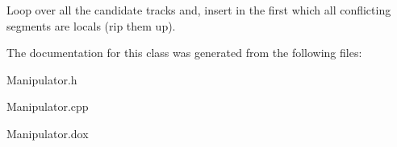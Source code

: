 Loop over all the candidate tracks and, insert in the first which all conflicting segments are locals (rip them up). 

The documentation for this class was generated from the following files\+:\begin{DoxyCompactItemize}
\item 
Manipulator.\+h\item 
Manipulator.\+cpp\item 
Manipulator.\+dox\end{DoxyCompactItemize}
